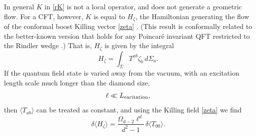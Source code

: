 \documentclass[aps,prd,showpacs,groupedaddress,nofootinbib,longbibliography,12pt]{revtex4-1}
\def\beq{\begin{equation}}
\def\eeq{\end{equation}}
\def\la{\langle}
\def\ra{\rangle}
\def\d{\delta}\def\D{\Delta}
\def\z{\zeta}
\def\O{\Omega}
\def\S{\Sigma }
\begin{document}
In general  $K$ in \eqref{rK} is not a local operator, and does not generate a geometric flow.
For a CFT, however, $K$ is equal to $H_\z$, the Hamiltonian generating the 
flow of the conformal boost Killing vector \eqref{zeta} \cite{Hislop:1981uh}. 
(This result is conformally related to the better-known version that holds for any
Poincar\'e invariant QFT restricted to the Rindler wedge \cite{Bisognano:1976za}.)
That is, $H_\z$ is given by the integral
%
\beq\label{Hz}
H_\z = \int_\Sigma T^{ab} \z_b\, d\Sigma_a.
\eeq
%
%
If the quantum field state is varied away from the vacuum, with an excitation length scale much 
longer than the diamond size, 
%
\beq\label{lexcitation}
\ell \ll L_{\rm excitation},
\eeq
then $\la T_{ab}\ra$ can be treated as constant, and 
using the Killing field \eqref{zeta}
we find
%
\beq\label{dHz}
\d \la H_\z\ra =\frac{\O_{d-2} \ell^d }{d^2-1}\, \d\la T_{00}\ra.
\eeq
%
\end{document}

